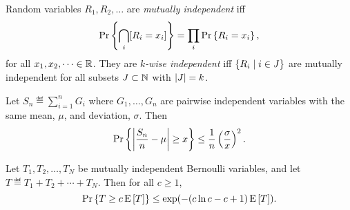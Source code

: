 \documentclass[11pt]{article}
\begin{document}
Random variables $R_1, R_2, \dots$ are \emph{mutually independent} iff
\[
\mathop{\textup{Pr}}\nolimits\left\{\bigcap_{i} [R_i = x_i]\right\} = \prod_{i} \mathop{\textup{Pr}}\nolimits\left\{R_i = x_i\right\},
\]
for all $x_1, x_2, \dots \in \mathbb{R}$.  They are \emph{$k$-wise
independent} iff $\left\{R_i \mid i\in J\right\}$ are mutually independent for
all subsets $J \subset \mathbb{N}$ with $\left|J\right| = k$.

\begin{theorem*}
Let $S_n \eqdef \sum_{i=1}^n G_i$ where $G_1, \dots, G_n$ are pairwise
independent variables with the same mean, $\mu$, and deviation, $\sigma$.
Then
\begin{equation}\label{Sndev}
\mathop{\textup{Pr}}\nolimits\left\{\left|\frac{S_n}{n} - \mu\right| \geq x\right\} \leq \frac{1}{n}
\left(\frac{\sigma}{x}\right)^2.
\end{equation}
\end{theorem*}

\begin{theorem*} 
Let $T_1, T_2, \dots, T_N$ be mutually independent Bernoulli variables,
and let $T \eqdef T_1 + T_2 + \cdots + T_N$.  Then for all $c \geq 1$,
\begin{equation}\label{Cher}
\mathop{\textup{Pr}}\nolimits\left\{T \geq c \mathop{\textup{E}}\nolimits\left[T\right]\right\} \leq \textup{exp}(- (c\ln c -c + 1) \mathop{\textup{E}}\nolimits\left[T\right]).
\end{equation}
\end{theorem*}
\end{document}
